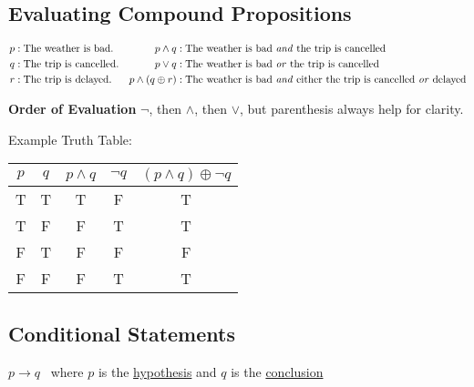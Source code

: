 \subsection{Evaluating Compound Propositions}

\begin{align*}
  p & : \text{The weather is bad.}    & p \land q            & : \text{The weather is bad \textit{and} the trip is cancelled}                            \\
  q & : \text{The trip is cancelled.} & p \lor q             & : \text{The weather is bad \textit{or} the trip is cancelled}                             \\
  r & : \text{The trip is delayed.}   & p \land (q \oplus r) & : \text{The weather is bad \textit{and} either the trip is cancelled \textit{or} delayed} \\
\end{align*}

\textbf{Order of Evaluation} $\lnot$, then $\land$, then $\lor$, but parenthesis always help for clarity.

\begin{center}
  Example Truth Table:
  \qquad
  \begin{tabular}{c|c|c|c|c}
    $p$ & $q$ & $p \land q$ & $\lnot q$ & $(p \land q) \oplus \lnot q$ \\
    \hline
    T   & T   & T           & F         & T                            \\
    T   & F   & F           & T         & T                            \\
    F   & T   & F           & F         & F                            \\
    F   & F   & F           & T         & T                            \\
  \end{tabular}
\end{center}

\subsection{Conditional Statements}

\begin{center}
  $p \rightarrow q$ \ where $p$ is the \underline{hypothesis} and $q$ is the \underline{conclusion}
\end{center}

